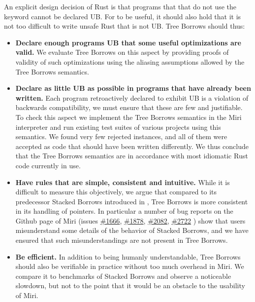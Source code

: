 \documentclass[a4paper,11pt]{article}
\theoremstyle{plain}
\theoremstyle{definition}
\theoremstyle{remark}
\newcommand{\tcode}[1]{\rstinline{#1}}
\begin{document}
An explicit design decision of Rust is that programs that that do not use the
\tcode{unsafe} keyword cannot be declared UB. For \tcode{unsafe} to be useful,
it should also hold that it is not too difficult to write unsafe Rust that is not
UB. Tree Borrows should thus:
\begin{itemize}
    \item \textbf{Declare enough programs UB that some useful optimizations are valid.}
        We evaluate Tree Borrows on this aspect by providing proofs of validity of such
        optimizations using the aliasing assumptions allowed by the Tree Borrows semantics.
    \item \textbf{Declare as little UB as possible in programs that have already been written.}
        Each program retroactively declared to exhibit UB is a violation of backwards compatibility,
        we must ensure that these are few and justifiable.
        To check this aspect we implement the Tree Borrows semantics in the Miri
        interpreter and run existing test suites of various projects using this semantics.
        We found very few rejected instances, and all of them were accepted as
        code that should have been written differently. We thus conclude that the Tree Borrows
        semantics are in accordance with most idiomatic Rust code currently in use.
    \item \textbf{Have rules that are simple, consistent and intuitive.}
        While it is difficult to measure this objectively, we argue that compared
        to its predecessor Stacked Borrows introduced in \cite{stacked_borrows},
        Tree Borrows is more consistent in its handling of pointers. In particular
        a number of bug reports on the Github page of Miri \cite{miri} (issues
        \href{https://github.com/rust-lang/miri/issues/1666}{\#1666},
        \href{https://github.com/rust-lang/miri/issues/1878}{\#1878},
        \href{https://github.com/rust-lang/miri/issues/2082}{\#2082},
        \href{https://github.com/rust-lang/miri/issues/2722}{\#2722}
        ) show that users misunderstand some details of the behavior of Stacked Borrows,
        and we have ensured that such misunderstandings
        are not present in Tree Borrows.
    \item \textbf{Be efficient.} In addition to being humanly understandable, Tree Borrows
        should also be verifiable in practice without too much overhead in Miri.
        We compare it to benchmarks of Stacked Borrows and observe a noticeable slowdown,
        but not to the point that it would be an obstacle to the usability of Miri.
\end{itemize}
\end{document}
